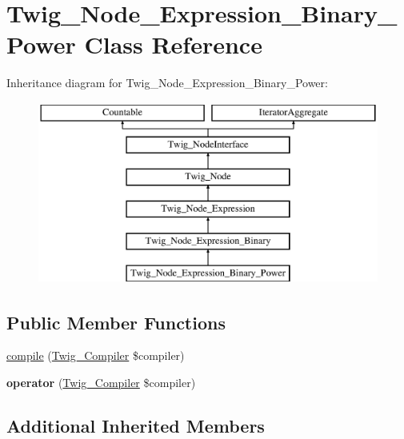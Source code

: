\hypertarget{class_twig___node___expression___binary___power}{}\section{Twig\+\_\+\+Node\+\_\+\+Expression\+\_\+\+Binary\+\_\+\+Power Class Reference}
\label{class_twig___node___expression___binary___power}
Inheritance diagram for Twig\+\_\+\+Node\+\_\+\+Expression\+\_\+\+Binary\+\_\+\+Power\+:\begin{figure}[H]
\begin{center}
\leavevmode
\includegraphics[height=6.000000cm]{class_twig___node___expression___binary___power}
\end{center}
\end{figure}
\subsection*{Public Member Functions}
\begin{DoxyCompactItemize}
\item 
\hyperlink{class_twig___node___expression___binary___power_a4e0faa87c3fae583620b84d3607085da}{compile} (\hyperlink{class_twig___compiler}{Twig\+\_\+\+Compiler} \$compiler)
\item 
\hypertarget{class_twig___node___expression___binary___power_af77318ec88d5f8a508684970a150b670}{}{\bfseries operator} (\hyperlink{class_twig___compiler}{Twig\+\_\+\+Compiler} \$compiler)\label{class_twig___node___expression___binary___power_af77318ec88d5f8a508684970a150b670}

\end{DoxyCompactItemize}
\subsection*{Additional Inherited Members}


